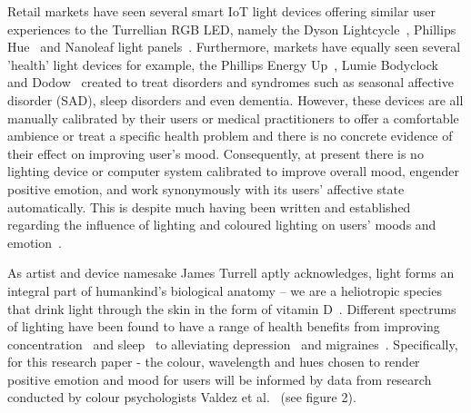 \documentclass{sigchi}
\begin{document}
Retail markets have seen several smart IoT light devices offering similar user experiences to the Turrellian RGB LED, namely the Dyson Lightcycle~\cite{Dyson01}, Phillips Hue~\cite{Phillips01} and Nanoleaf light panels~\cite{Nanoleaf01}. Furthermore, markets have equally seen several 'health' light devices for example, the Phillips Energy Up~\cite{Phillips01}, Lumie Bodyclock~\cite{Lumie01} and Dodow~\cite{Dodow01} created to treat disorders and syndromes such as seasonal affective disorder (SAD), sleep disorders and even dementia. However, these devices are all manually calibrated by their users or medical practitioners to offer a comfortable ambience or treat a specific health problem and there is no concrete evidence of their effect on improving user’s mood. Consequently, at present there is no lighting device or computer system calibrated to improve overall mood, engender positive emotion, and work synonymously with its users’ affective state automatically. This is despite much having been written and established regarding the influence of lighting and coloured lighting on users’ moods and emotion~\cite{baron1992effects, han2017effects, jo2014smart, kim2014study, lee2019effects, wardono2012effects, yang2015lighting}. 

As artist and device namesake James Turrell aptly acknowledges, light forms an integral part of humankind’s biological anatomy – we are a heliotropic species that drink light through the skin in the form of vitamin D~\cite{adcock1990james, basse2016light}. Different spectrums of lighting have been found to have a range of health benefits from improving concentration~\cite{kuller2006impact} and sleep~\cite{figueiro2016office} to alleviating depression~\cite{kripke1998light} and migraines~\cite{Green01}. Specifically, for this research paper - the colour, wavelength and hues chosen to render positive emotion and mood for users will be informed by data from research conducted by colour psychologists Valdez et al.~\cite{valdez1994effects} (see figure 2). 
\end{document}
